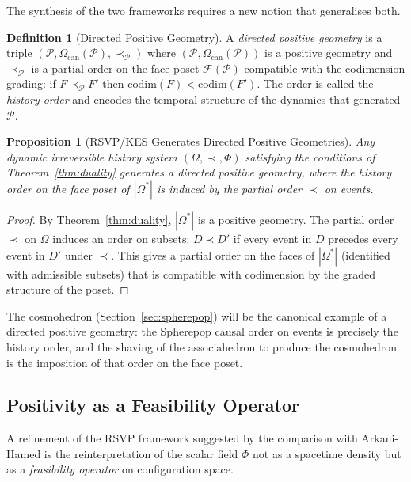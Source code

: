 \documentclass[12pt, oneside]{amsart}
\theoremstyle{plain}
\newtheorem{proposition}[theorem]{Proposition}
\theoremstyle{definition}
\newtheorem{definition}[theorem]{Definition}
\theoremstyle{remark}
\newcommand{\Phif}{\Phi}   %
\newcommand{\OmKS}{\Omega}
\newcommand{\CF}{\Omega_{\mathrm{can}}}
\begin{document}
The synthesis of the two frameworks requires a new notion that generalises both.

\begin{definition}[Directed Positive Geometry]
\label{def:dpg}
A \emph{directed positive geometry} is a triple $(\mathcal{P}, \CF(\mathcal{P}), \prec_\mathcal{P})$ where $(\mathcal{P}, \CF(\mathcal{P}))$ is a positive geometry and $\prec_\mathcal{P}$ is a partial order on the face poset $\mathcal{F}(\mathcal{P})$ compatible with the codimension grading: if $F \prec_\mathcal{P} F'$ then $\mathrm{codim}(F) < \mathrm{codim}(F')$. The order is called the \emph{history order} and encodes the temporal structure of the dynamics that generated $\mathcal{P}$.
\end{definition}

\begin{proposition}[RSVP/KES Generates Directed Positive Geometries]
\label{prop:directed}
Any dynamic irreversible history system $(\OmKS, \prec, \Phif)$ satisfying the conditions of Theorem~\ref{thm:duality} generates a directed positive geometry, where the history order on the face poset of $|\OmKS^*|$ is induced by the partial order $\prec$ on events.
\end{proposition}

\begin{proof}
By Theorem~\ref{thm:duality}, $|\OmKS^*|$ is a positive geometry. The partial order $\prec$ on $\OmKS$ induces an order on subsets: $D \prec D'$ if every event in $D$ precedes every event in $D'$ under $\prec$. This gives a partial order on the faces of $|\OmKS^*|$ (identified with admissible subsets) that is compatible with codimension by the graded structure of the poset.
\end{proof}

The cosmohedron (Section~\ref{sec:spherepop}) will be the canonical example of a directed positive geometry: the Spherepop causal order on events is precisely the history order, and the shaving of the associahedron to produce the cosmohedron is the imposition of that order on the face poset.

\subsection{Positivity as a Feasibility Operator}

A refinement of the RSVP framework suggested by the comparison with Arkani-Hamed is the reinterpretation of the scalar field $\Phif$ not as a spacetime density but as a \emph{feasibility operator} on configuration space.
\end{document}
